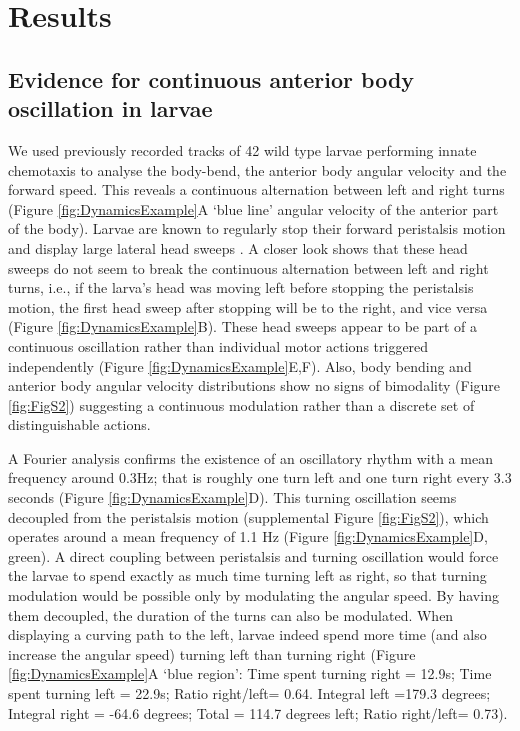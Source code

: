 \documentclass[11pt,a4paper]{article}
\newcommand{\todoKL}[1]{\todo[author=KL,color=blue!40, size=\tiny,inline]{1}}
\begin{document}
\section{Results}
\subsection{Evidence for continuous anterior body oscillation in larvae}
 We used previously recorded tracks of 42 wild type larvae performing innate chemotaxis \citep{gomez2012active} to analyse the body-bend, the anterior body angular velocity and the forward speed. This reveals a continuous alternation between left and right turns (Figure \ref{fig:DynamicsExample}A ‘blue line’ angular velocity of the anterior part of the body). Larvae are known to regularly stop their forward peristalsis motion and display large lateral head sweeps \citep{gomez2011active}. A closer look shows that these head sweeps do not seem to break the continuous alternation between left and right turns, i.e., if the larva’s head was moving left before stopping the peristalsis motion, the first head sweep after stopping will be to the right, and vice versa (Figure \ref{fig:DynamicsExample}B). These head sweeps appear to be part of a continuous oscillation rather than individual motor actions triggered independently (Figure \ref{fig:DynamicsExample}E,F). Also, body bending and anterior body angular velocity distributions show no signs of bimodality (Figure \ref{fig:FigS2}) suggesting a continuous modulation rather than a discrete set of distinguishable actions. 

A Fourier analysis confirms the existence of an oscillatory rhythm with a mean frequency around 0.3Hz; that is roughly one turn left and one turn right every 3.3 seconds (Figure \ref{fig:DynamicsExample}D). This turning oscillation seems decoupled from the peristalsis motion (supplemental Figure \ref{fig:FigS2}), which operates around a mean frequency of 1.1 Hz (Figure \ref{fig:DynamicsExample}D, green).
\todoKL{point of coupling peristalsis to turn reads unclear/ consider rephrasing}
 A direct coupling between peristalsis and turning oscillation would force the larvae to spend exactly as much time turning left as right, so that turning modulation would be possible only by modulating the angular speed. By having them decoupled, the duration of the turns can also be modulated. When displaying a curving path to the left, larvae indeed spend more time (and also increase the angular speed) turning left than turning right (Figure \ref{fig:DynamicsExample}A ‘blue region’:  Time spent turning right = 12.9s; Time spent turning left = 22.9s; Ratio right/left= 0.64. Integral left =179.3 degrees; Integral right = -64.6 degrees; Total = 114.7 degrees left; Ratio right/left= 0.73).
\end{document}
